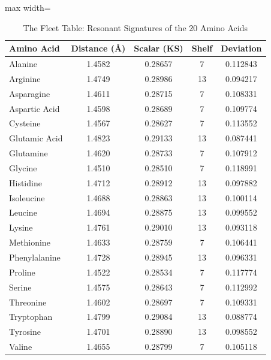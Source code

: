 \documentclass[11pt, letterpaper, openany]{book}
\begin{document}
\begin{table}[H]
\centering
\caption{The Fleet Table: Resonant Signatures of the 20 Amino Acids}
\begin{adjustbox}{max width=\textwidth}
\begin{tabular}{lcccc}
\toprule
\textbf{Amino Acid} & \textbf{Distance (Å)} & \textbf{Scalar (KS)} &
\textbf{Shelf} & \textbf{Deviation} \\
\midrule
Alanine         & 1.4582 & 0.28657 & 7  & 0.112843 \\
Arginine        & 1.4749 & 0.28986 & 13 & 0.094217 \\
Asparagine      & 1.4611 & 0.28715 & 7  & 0.108331 \\
Aspartic Acid   & 1.4598 & 0.28689 & 7  & 0.109774 \\
Cysteine        & 1.4567 & 0.28627 & 7  & 0.113552 \\
Glutamic Acid   & 1.4823 & 0.29133 & 13 & 0.087441 \\
Glutamine       & 1.4620 & 0.28733 & 7  & 0.107912 \\
Glycine         & 1.4510 & 0.28510 & 7  & 0.118991 \\
Histidine       & 1.4712 & 0.28912 & 13 & 0.097882 \\
Isoleucine      & 1.4688 & 0.28863 & 13 & 0.100114 \\
Leucine         & 1.4694 & 0.28875 & 13 & 0.099552 \\
Lysine          & 1.4761 & 0.29010 & 13 & 0.093118 \\
Methionine      & 1.4633 & 0.28759 & 7  & 0.106441 \\
Phenylalanine   & 1.4728 & 0.28945 & 13 & 0.096331 \\
Proline         & 1.4522 & 0.28534 & 7  & 0.117774 \\
Serine          & 1.4575 & 0.28643 & 7  & 0.112992 \\
Threonine       & 1.4602 & 0.28697 & 7  & 0.109331 \\
Tryptophan      & 1.4799 & 0.29084 & 13 & 0.088774 \\
Tyrosine        & 1.4701 & 0.28890 & 13 & 0.098552 \\
Valine          & 1.4655 & 0.28799 & 7  & 0.105118 \\
\bottomrule
\end{tabular}
\end{adjustbox}
\end{table}

\end{document}
